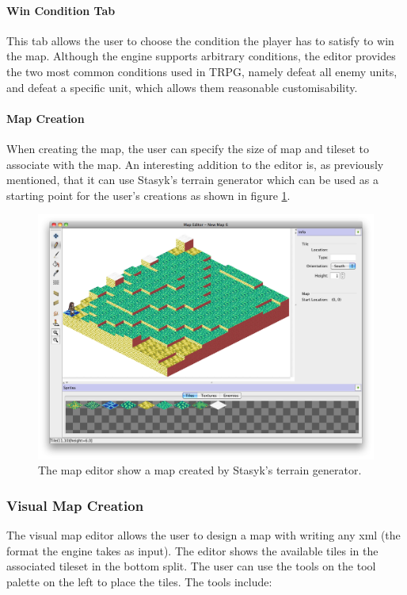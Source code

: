 \paragraph{Win Condition Tab\\}
This tab allows the user to choose the condition the player has to satisfy to win the map. Although the engine supports arbitrary conditions, the editor provides the two most common conditions used in TRPG, namely defeat all enemy units, and defeat a specific unit, which allows them  reasonable customisability.

\paragraph{Map Creation\\}
When creating the map, the user can specify the size of map and tileset to associate with the map.  An interesting addition to the editor is, as previously  mentioned, that it can use Stasyk's terrain generator which can be used as a starting point for the user's creations as shown in figure \ref{fig:figures_editor_gen}.

\begin{figure}[htb]
	\centering
		\includegraphics[width=\textwidth]{figures/editor/gen.png}
	\caption{The map editor show a map created by Stasyk's terrain generator.}
	\label{fig:figures_editor_gen}
\end{figure}

\subsubsection{Visual Map Creation}
The visual map editor allows the user to design a map with writing any xml (the format the engine takes as input).  The editor shows the available tiles in the associated tileset in the bottom split.  The user can use the tools on the tool palette on the left to place the tiles.  The tools include:

